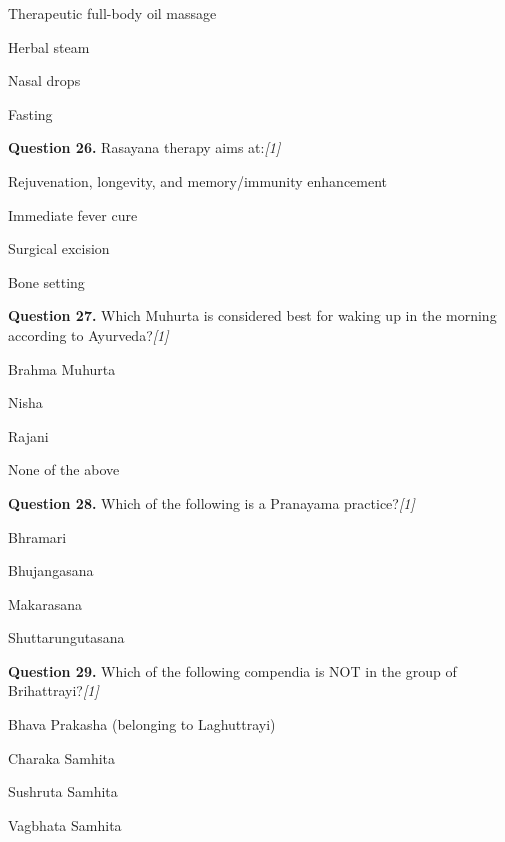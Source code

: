 \documentclass[11pt,a4paper]{article}
\newcommand{\pts}[1]{\hfill   \textit{[#1]}}
\begin{document}
\begin{parts}
  \item Therapeutic full-body oil massage
  \item Herbal steam
  \item Nasal drops
  \item Fasting
\end{parts}

\medskip




\noindent   \textbf{Question 26.} Rasayana therapy aims at:\pts{1}

\begin{parts}
  \item Rejuvenation, longevity, and memory/immunity enhancement
  \item Immediate fever cure
  \item Surgical excision
  \item Bone setting
\end{parts}

\medskip




\noindent   \textbf{Question 27.} Which Muhurta is considered best for waking up in the morning according to Ayurveda?\pts{1}

\begin{parts}
  \item Brahma Muhurta
  \item Nisha
  \item Rajani
  \item None of the above
\end{parts}

\medskip




\noindent   \textbf{Question 28.} Which of the following is a Pranayama practice?\pts{1}

\begin{parts}
  \item Bhramari
  \item Bhujangasana
  \item Makarasana
  \item Shuttarungutasana
\end{parts}

\medskip




\noindent   \textbf{Question 29.} Which of the following compendia is NOT in the group of Brihattrayi?\pts{1}

\begin{parts}
  \item Bhava Prakasha (belonging to Laghuttrayi)
  \item Charaka Samhita
  \item Sushruta Samhita
  \item Vagbhata Samhita
\end{parts}
\end{document}
